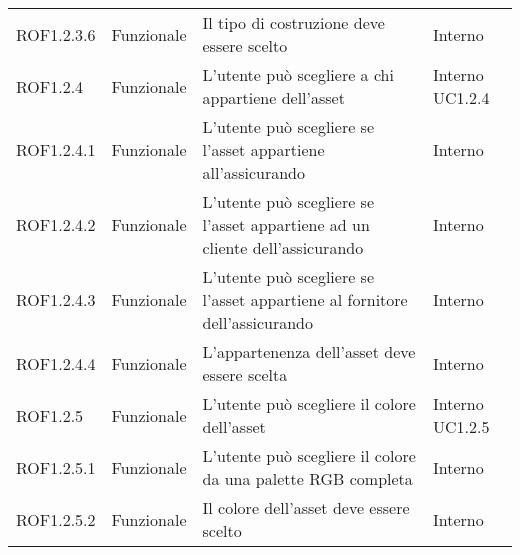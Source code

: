 \begin{longtable}{p{2cm}!{\VRule[1pt]}p{2cm}!{\VRule[1pt]}p{5cm}!{\VRule[1pt]}p{1.5cm}}
	ROF1.2.3.6                       & Funzionale\newline               & Il tipo di costruzione deve essere scelto                                                                                 & Interno                      \\
	ROF1.2.4                         & Funzionale\newline               & L'utente può scegliere a chi appartiene dell'asset                                                                       & Interno \newline UC1.2.4     
	\\
	ROF1.2.4.1                       & Funzionale\newline               & L'utente può scegliere se l'asset appartiene all'assicurando                                                             & Interno                      \\
	ROF1.2.4.2                       & Funzionale\newline               & L'utente può scegliere se l'asset appartiene ad un cliente dell'assicurando                                              & Interno                      \\
	ROF1.2.4.3                       & Funzionale\newline               & L'utente può scegliere se l'asset appartiene al fornitore dell'assicurando                                               & Interno                      \\
	ROF1.2.4.4                       & Funzionale\newline               & L'appartenenza dell'asset deve essere scelta                                                                              & Interno                      \\
	ROF1.2.5                         & Funzionale\newline               & L'utente può scegliere il colore dell'asset                                                                              & Interno \newline UC1.2.5     
	\\
	ROF1.2.5.1                       & Funzionale\newline               & L'utente può scegliere il colore da una palette RGB completa                                                             & Interno                      \\
	ROF1.2.5.2                       & Funzionale\newline               & Il colore dell'asset deve essere scelto                                                                                   & Interno                      \\

\end{longtable}
